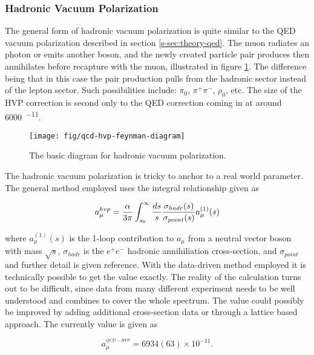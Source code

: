 \subsubsection{Hadronic Vacuum Polarization}

The general form of hadronic vacuum polarization is quite similar to the QED vacuum polarization described in section \ref{s-sec:theory-qed}.  The muon radiates an photon or emits another boson, and the newly created particle pair produces then annihilates before recapture with the muon, illustrated in figure \ref{fig:qcd-hvp-feynman-diagram}.  The difference being that in this case the pair production pulls from the hadronic sector instead of the lepton sector.  Such possibilities include: $\pi_0$, $\pi^+\pi^-$, $\rho_0$, etc.  The size of the HVP correction is second only to the QED correction coming in at around \SI{6000}{^{-11}}.  

\begin{figure}
\label{fig:qcd-hvp-feynman-diagram}
\centering
\texttt{[image: fig/qcd-hvp-feynman-diagram]}
\caption{The basic diagram for hadronic vacuum polarization.}
\end{figure}

The hadronic vacuum polarization is tricky to anchor to a real world parameter.  The general method employed uses the integral relationship given as

\begin{equation}
\label{eqn:qcd-hvp-integral}
a_\mu^{hvp} = \frac{\alpha}{3\pi} \int_{s_0}^{\infty} \frac{ds}{s} \\
\frac{\sigma_{hadr}(s)}{\sigma_{point}(s)} a_\mu^{(1)}(s)
\end{equation}

\noindent
where $a_\mu^{(1)}(s)$ is the 1-loop contribution to $a_\mu$ from a neutral vector boson with mass $\sqrt{s}$, $\sigma_{hadr}$ is the $e^+e^-$ hadronic annihiliation cross-section, and $\sigma_{point}$ and further detail is given reference\cite{amm-of-muon}.  With the data-driven method employed it is technically possible to get the value exactly.  The reality of the calculation turns out to be difficult, since data from many different experiment needs to be well understood and combines to cover the whole spectrum.  The value could possibly be improved by adding additional cross-section data or through a lattice based approach.  The currently value is given as

\begin{equation}
\label{eqn:qcd-hvp-total}
a_\mu^{^{QCD-HVP}} = 6934(63) \times 10^{-11}.
\end{equation}

